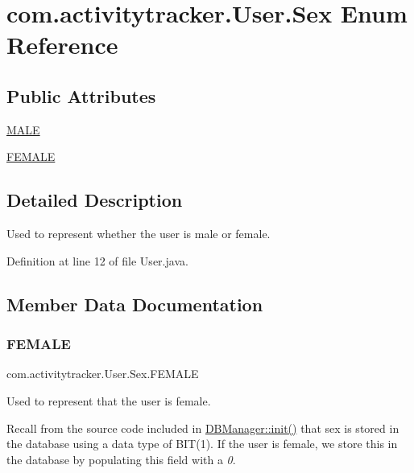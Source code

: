 \hypertarget{enumcom_1_1activitytracker_1_1_user_1_1_sex}{}\section{com.\+activitytracker.\+User.\+Sex Enum Reference}
\label{enumcom_1_1activitytracker_1_1_user_1_1_sex}
\subsection*{Public Attributes}
\begin{DoxyCompactItemize}
\item 
\mbox{\hyperlink{enumcom_1_1activitytracker_1_1_user_1_1_sex_ad3b626a38bd4615eb621d75b939f412d}{M\+A\+LE}}
\item 
\mbox{\hyperlink{enumcom_1_1activitytracker_1_1_user_1_1_sex_a5c22ece8a4df71ed5202cd492990a752}{F\+E\+M\+A\+LE}}
\end{DoxyCompactItemize}


\subsection{Detailed Description}
Used to represent whether the user is male or female. 

Definition at line 12 of file User.\+java.



\subsection{Member Data Documentation}
\mbox{\label{enumcom_1_1activitytracker_1_1_user_1_1_sex_a5c22ece8a4df71ed5202cd492990a752}} 
\subsubsection{\texorpdfstring{F\+E\+M\+A\+LE}{FEMALE}}
{\footnotesize\ttfamily com.\+activitytracker.\+User.\+Sex.\+F\+E\+M\+A\+LE}

Used to represent that the user is female.

Recall from the source code included in \mbox{\hyperlink{classcom_1_1activitytracker_1_1_d_b_manager_a41df4600bb5901a26a4ea6a7108a70b9}{D\+B\+Manager\+::init()}} that sex is stored in the database using a data type of B\+I\+T(1). If the user is female, we store this in the database by populating this field with a {\itshape 0}. 

